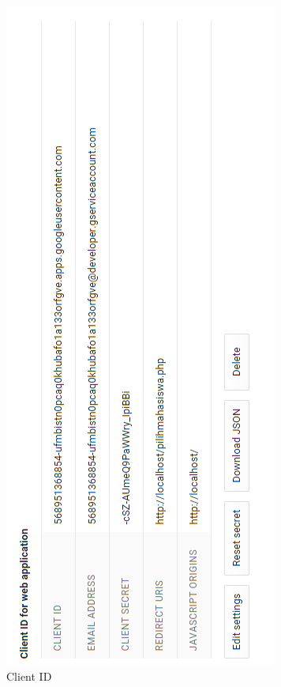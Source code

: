 \begin{figure}[H]
\centering
\includegraphics[scale=1]{Gambar/clientid.png}
\caption[Client ID]{Client ID} 
\label{fig:clientid}
\end{figure}

